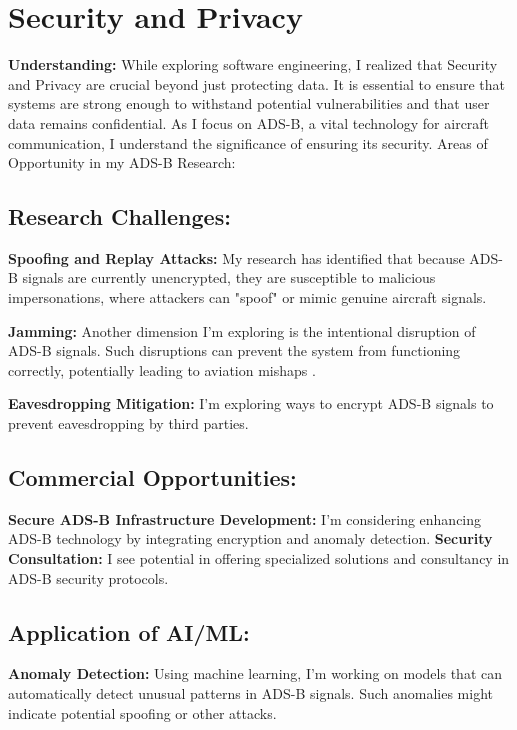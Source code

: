 \documentclass[11pt,journal,compsoc]{article}
\begin{document}
\section{Security and Privacy}

\textbf{Understanding:} While exploring software engineering, I realized that Security and Privacy are crucial beyond just protecting data. It is essential to ensure that systems are strong enough to withstand potential vulnerabilities and that user data remains confidential. As I focus on ADS-B, a vital technology for aircraft communication, I understand the significance of ensuring its security. Areas of Opportunity in my ADS-B Research:

\subsection{Research Challenges:}

\textbf{Spoofing and Replay Attacks:} My research has identified that because ADS-B signals are currently unencrypted, they are susceptible to malicious impersonations, where attackers can "spoof" or mimic genuine aircraft signals.

\textbf{Jamming:} Another dimension I'm exploring is the intentional disruption of ADS-B signals. Such disruptions can prevent the system from functioning correctly, potentially leading to aviation mishaps \cite{ref1}.

\textbf{Eavesdropping Mitigation:} I'm exploring ways to encrypt ADS-B signals to prevent eavesdropping by third parties.


\subsection{Commercial Opportunities:}
\textbf{Secure ADS-B Infrastructure Development:} I'm considering enhancing ADS-B technology by integrating encryption and anomaly detection.
\textbf{Security Consultation:} I see potential in offering specialized solutions and consultancy in ADS-B security protocols.


\subsection{Application of AI/ML:}
\textbf{Anomaly Detection:} Using machine learning, I'm working on models that can automatically detect unusual patterns in ADS-B signals. Such anomalies might indicate potential spoofing or other attacks.
\end{document}

